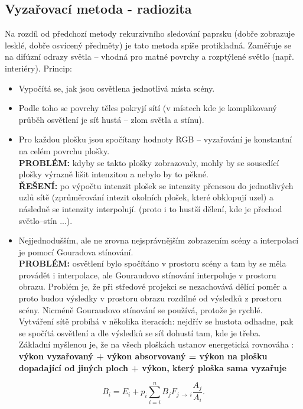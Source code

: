 \subsection{Vyzařovací metoda - radiozita}
Na rozdíl od předchozí metody rekurzivního sledování paprsku (dobře zobrazuje lesklé, dobře osvícený předměty) je tato metoda spíše protikladná. Zaměřuje se na difúzní odrazy světla -- vhodná pro matné povrchy a rozptýlené světlo (např. interiéry). Princip:
\begin{itemize}
\item Vypočítá se, jak jsou osvětlena jednotlivá místa scény.
\item Podle toho se povrchy těles pokryjí sítí (v místech kde je komplikovaný průběh osvětlení je síť hustá -- zlom světla a stínu).
\item Pro každou plošku jsou spočítany hodnoty RGB -- vyzařování je konstantní na celém povrchu plošky.\\
	\textbf{PROBLÉM:} kdyby se takto plošky zobrazovaly, mohly by se sousedící plošky výrazně lišit intenzitou a nebylo by to pěkné.\\
	\textbf{ŘEŠENÍ:} po výpočtu intenzit plošek se intenzity přenesou do jednotlivých uzlů sítě (zprůměrování intezit okolních plošek, které obklopují uzel) a následně se intenzity interpolují. (proto i to hustší dělení, kde je přechod světlo--stín ...).
\item Nejjednodušším, ale ne zrovna nejsprávnějším zobrazením scény a interpolací je pomocí Gouradova stínování. \\
	\textbf{PROBLÉM:} osvětlení bylo spočítáno v prostoru scény a tam by se měla provádět i interpolace, ale Gouraudovo stínování interpoluje v prostoru obrazu. Problém je, že při středové projekci se nezachovává dělící poměr a proto budou výsledky v prostoru obrazu rozdílné od výsledků z prostoru scény. Nicméně Gouraudovo stínování se používá, protože je rychlé.\\
	Vytváření sítě probíhá v několika iteracích: nejdřív se hustota odhadne, pak se spočítá osvětlení a dle výsledků se síť dohustí tam, kde je třeba.\\
	Základní myšlenou je, že na všech ploškách ustanov energetická rovnováha : \\
	\textbf{ výkon vyzařovaný + výkon absorvovaný = výkon na plošku dopadající od jiných ploch + výkon, který ploška sama vyzařuje} \\
\end{itemize}
\begin{equation*}
	B_i = E_i + p_i \sum\limits_{i=i}^n B_j F_{j \,\to\, i} \frac{A_j}{A_i}.
\end{equation*}
